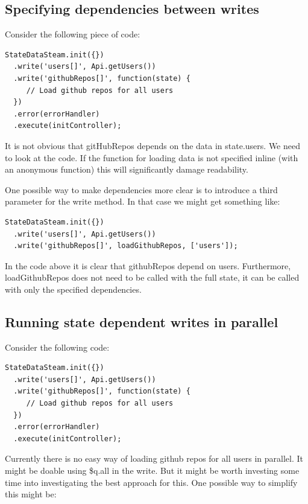 \documentclass[a4paper,12pt]{article}
\begin{document}
\subsection{Specifying dependencies between writes}
\label{sec:spec_dependencies}
Consider the following piece of code:

\begin{lstlisting}[caption=Executing the stream, frame=single]
StateDataSteam.init({})
  .write('users[]', Api.getUsers())
  .write('githubRepos[]', function(state) {
     // Load github repos for all users
  })
  .error(errorHandler)
  .execute(initController);
\end{lstlisting}
It is not obvious that gitHubRepos depends on the data in state.users. We need to look at the code. If the function for loading data is not specified inline (with an anonymous function) this will significantly damage readability.

One possible way to make dependencies more clear is to introduce a third parameter for the write method. In that case we might get something like:

\begin{lstlisting}[caption=Executing the stream, frame=single]
StateDataSteam.init({})
  .write('users[]', Api.getUsers())
  .write('githubRepos[]', loadGithubRepos, ['users']);
\end{lstlisting}
In the code above it is clear that githubRepos depend on users. Furthermore, loadGithubRepos does not need to be called with the full
state, it can be called with only the specified dependencies.

\clearpage

\subsection{Running state dependent writes in parallel}
Consider the following code:
\begin{lstlisting}[caption=Executing the stream, frame=single]
StateDataSteam.init({})
  .write('users[]', Api.getUsers())
  .write('githubRepos[]', function(state) {
     // Load github repos for all users
  })
  .error(errorHandler)
  .execute(initController);
\end{lstlisting}
Currently there is no easy way of loading github repos for all users in parallel. It might be doable using \$q.all in the write. But it might be worth investing some time into investigating 
the best approach for this. One possible way to simplify this might be:
\end{document}
